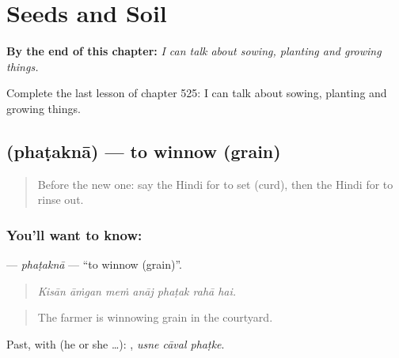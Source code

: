 
\chapter{Seeds and Soil}
\label{ch:hi-seeds-and-soil}

\begin{chapteropening}
\textbf{By the end of this chapter:} \emph{I can talk about sowing, planting and growing things.}

Complete the last lesson of chapter 525: I can talk about sowing, planting and growing things.
\end{chapteropening}

\section[\texorpdfstring{\hi{फटकना} (phaṭaknā)}{फटकना (phaṭaknā)}]{ (phaṭaknā) — to winnow (grain)}

\label{lesson:HI-C525-phatakna}



\begin{quote}
Before the new one: say the Hindi for to set (curd), then the Hindi for to rinse out.
\end{quote}

\subsection*{You'll want to know: }
\textbf{} — \emph{phaṭaknā} — \textquotedblleft{}to winnow (grain)\textquotedblright{}.

\begin{quote}
      
\end{quote}

\begin{quote}
\emph{Kisān āṁgan meṁ anāj phaṭak rahā hai.}
\end{quote}

\begin{quote}
The farmer is winnowing grain in the courtyard.
\end{quote}

Past, with  (he or she …):   , \emph{usne cāval phaṭke}.


